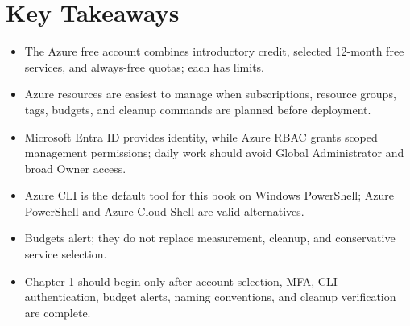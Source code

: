 \section*{Key Takeaways}
\begin{itemize}
    \item The Azure free account combines introductory credit, selected 12-month free services, and always-free quotas; each has limits.
    \item Azure resources are easiest to manage when subscriptions, resource groups, tags, budgets, and cleanup commands are planned before deployment.
    \item Microsoft Entra ID provides identity, while Azure RBAC grants scoped management permissions; daily work should avoid Global Administrator and broad Owner access.
    \item Azure CLI is the default tool for this book on Windows PowerShell; Azure PowerShell and Azure Cloud Shell are valid alternatives.
    \item Budgets alert; they do not replace measurement, cleanup, and conservative service selection.
    \item Chapter 1 should begin only after account selection, MFA, CLI authentication, budget alerts, naming conventions, and cleanup verification are complete.
\end{itemize}

